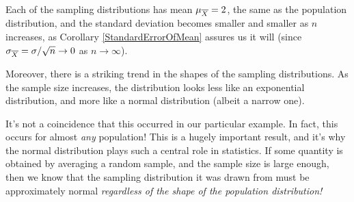 \begin{center}
    \begin{minipage}{.5\textwidth}
        \centering
    \end{minipage}%
    \begin{minipage}{0.5\textwidth}
        \centering
\end{minipage}
\end{center}
\par
Each of the sampling distributions has mean $\mu_{\overline{X}} = 2$, the same as the population distribution, and the standard deviation becomes smaller and smaller as $n$ increases, as Corollary \ref{StandardErrorOfMean} assures us it will (since $\sigma_{\overline{X}} = \sigma / \sqrt{n} \to 0$ as $n \to \infty$).
\par
Moreover, there is a striking trend in the shapes of the sampling distributions. As the sample size increases, the distribution looks less like an exponential distribution, and more like a normal distribution (albeit a narrow one).
\par
It's not a coincidence that this occurred in our particular example. In fact, this occurs for almost \emph{any} population! This is a hugely important result, and it's why the normal distribution plays such a central role in statistics. If some quantity is obtained by averaging a random sample, and the sample size is large enough, then we know that the sampling distribution it was drawn from must be approximately normal \emph{regardless of the shape of the population distribution!}
